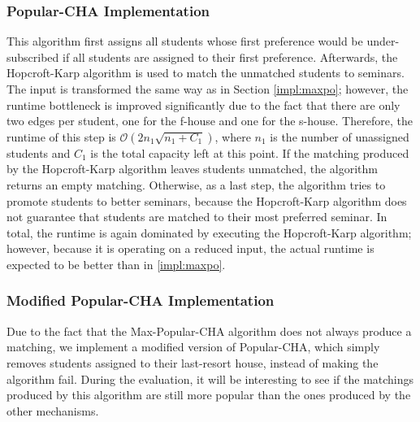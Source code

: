 \subsubsection{Popular-CHA Implementation}
This algorithm first assigns all students whose first preference would be under-subscribed if all students are assigned to their first preference. Afterwards, the Hopcroft-Karp algorithm is used to match the unmatched students to seminars. The input is transformed the same way as in Section \ref{impl:maxpo}; however, the runtime bottleneck is improved significantly due to the fact that there are only two edges per student, one for the f-house and one for the s-house. Therefore, the runtime of this step is $\mathcal{O}(2n_1\sqrt{n_1+C_1})$, where $n_1$ is the number of unassigned students and $C_1$ is the total capacity left at this point. If the matching produced by the Hopcroft-Karp algorithm leaves students unmatched, the algorithm returns an empty matching. Otherwise, as a last step, the algorithm tries to promote students to better seminars, because the Hopcroft-Karp algorithm does not guarantee that students are matched to their most preferred seminar. In total, the runtime is again dominated by executing the Hopcroft-Karp algorithm; however, because it is operating on a reduced input, the actual runtime is expected to be better than in \ref{impl:maxpo}.

\subsubsection{Modified Popular-CHA Implementation}\label{impl:mod-max-pop}
Due to the fact that the Max-Popular-CHA algorithm does not always produce a matching, we implement a modified version of Popular-CHA, which simply removes students assigned to their last-resort house, instead of making the algorithm fail. During the evaluation, it will be interesting to see if the matchings produced by this algorithm are still more popular than the ones produced by the other mechanisms.


